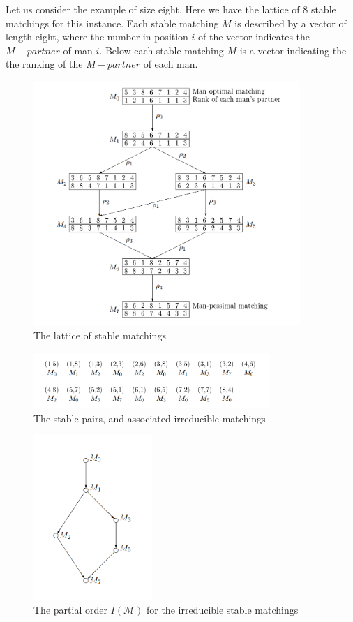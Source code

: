 Let us consider the example of size eight. Here we have the lattice of 8 stable matchings for this instance. Each stable matching $M$ is described by a vector of length eight, where the number in position $i$ of the vector indicates the $M-partner$ of man $i$. Below each stable matching $M$ is a vector indicating the the ranking of the $M-partner$ of each man. 

\begin{figure}[ht]
  \centering
  \includegraphics[width=0.9\textwidth]{IMAGES_FIGS/FIG_2_1.png}
  \caption{The lattice of stable matchings}
  \label{FIG_2_2}
\end{figure}

\begin{figure}[ht]
  \centering
  \includegraphics[width=0.8\textwidth]{IMAGES_FIGS/FIG_2_2.png}
  \caption{The stable pairs, and associated irreducible matchings}
  \label{FIG_2_3}
\end{figure}

\begin{figure}[ht]
  \centering
  \includegraphics[width=0.4\textwidth]{IMAGES_FIGS/FIG_2_3.png}
  \caption{The partial order $I(\mathcal{M})$ for the irreducible stable matchings}
  \label{FIG_2_4}
\end{figure}

